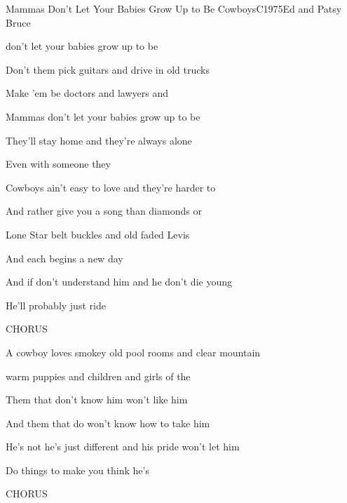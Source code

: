 \begin{song}{Mammas Don't Let Your Babies Grow Up to Be Cowboys}{C}{1975}{Ed and Patsy Bruce}{}{}
  \begin{SBChorus}

     don't let your babies grow up to be 

    Don't  them pick guitars and drive in old trucks

    Make 'em be doctors and lawyers and 

    Mammas don't let your babies grow up to be 

    They'll  stay home and they're always alone

    Even with someone they 
  \end{SBChorus}

  \begin{SBVerse}
    Cowboys ain't easy to love and they're harder to 

    And  rather give you a song than diamonds or 

    Lone Star belt buckles and old faded Levis

    And each  begins a new day

    And if  don't understand him and he don't die young

    He'll probably just ride 
  \end{SBVerse}
  \begin{SBChorus}
    CHORUS
  \end{SBChorus}

  \begin{SBVerse}

    A cowboy loves smokey old pool rooms and clear mountain 

     warm puppies and children and girls of the 

    Them that don't know him won't like him

    And them that do  won't know how to take him

    He's not  he's just different and his pride won't let him

    Do things to make you think he's 
  \end{SBVerse}
  \begin{SBChorus}
    CHORUS
  \end{SBChorus}
\end{song}
